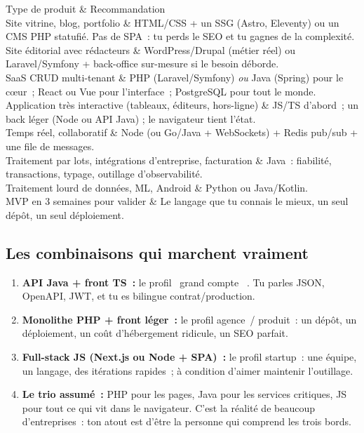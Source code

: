 \begin{tablez}[p{0.24\textwidth}X]
  \headrow Type de produit \& Recommandation \\
  \midrule
  Site vitrine, blog, portfolio \& HTML/CSS + un SSG (Astro, Eleventy) ou un CMS PHP statufi\'e. Pas de SPA~: tu perds le SEO et tu gagnes de la complexit\'e. \\
  Site \'editorial avec r\'edacteurs \& WordPress/Drupal (m\'etier r\'eel) ou Laravel/Symfony + back-office sur-mesure si le besoin d\'eborde. \\
  SaaS CRUD multi-tenant \& PHP (Laravel/Symfony) \emph{ou} Java (Spring) pour le c\oe{}ur~; React ou Vue pour l'interface~; PostgreSQL pour tout le monde. \\
  Application tr\`es interactive (tableaux, \'editeurs, hors-ligne) \& JS/TS d'abord~; un back l\'eger (Node ou API Java) ; le navigateur tient l'\'etat. \\
  Temps r\'eel, collaboratif \& Node (ou Go/Java + WebSockets) + Redis pub/sub + une file de messages. \\
  Traitement par lots, int\'egrations d'entreprise, facturation \& Java~: fiabilit\'e, transactions, typage, outillage d'observabilit\'e. \\
  Traitement lourd de donn\'ees, ML, Android \& Python ou Java/Kotlin. \\
  MVP en 3 semaines pour valider \& Le langage que tu connais le mieux, un seul d\'ep\^ot, un seul d\'eploiement. \\
\end{tablez}

\subsection{Les combinaisons qui marchent vraiment}

\begin{enumerate}
  \item \textbf{API Java + front TS~:} le profil \og ~grand compte~ \fg{}. Tu parles JSON, OpenAPI, JWT,
        et tu es bilingue contrat/production.
  \item \textbf{Monolithe PHP + front l\'eger~:} le profil agence~/ produit~: un d\'ep\^ot, un d\'eploiement,
        un co\^ut d'h\'ebergement ridicule, un SEO parfait.
  \item \textbf{Full-stack JS (Next.js ou Node + SPA)~:} le profil startup~: une \'equipe, un langage,
        des it\'erations rapides~; \`a condition d'aimer maintenir l'outillage.
  \item \textbf{Le trio assum\'e~:} PHP pour les pages, Java pour les services critiques, JS pour tout ce
        qui vit dans le navigateur. C'est la r\'ealit\'e de beaucoup d'entreprises~: ton atout est
        d'\^etre la personne qui comprend les trois bords.
\end{enumerate}

